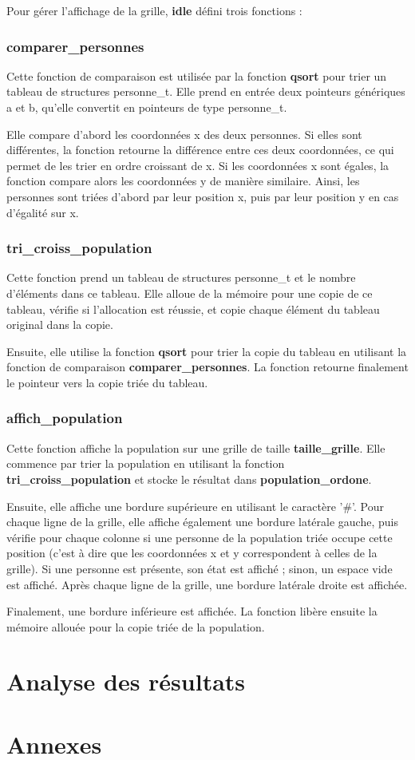 \documentclass[12pt,french,titlepage]{article}
\begin{document}
Pour gérer l'affichage de la grille, \textbf{idle} défini trois fonctions :
\subsubsection*{comparer\_personnes}
Cette fonction de comparaison est utilisée par la fonction \textbf{qsort} pour trier un tableau de structures personne\_t. Elle prend en entrée deux pointeurs génériques a et b, qu'elle convertit en pointeurs de type personne\_t.

Elle compare d'abord les coordonnées x des deux personnes. Si elles sont différentes, la fonction retourne la différence entre ces deux coordonnées, ce qui permet de les trier en ordre croissant de x. Si les coordonnées x sont égales, la fonction compare alors les coordonnées y de manière similaire. Ainsi, les personnes sont triées d'abord par leur position x, puis par leur position y en cas d'égalité sur x.

\subsubsection*{tri\_croiss\_population}
Cette fonction prend un tableau de structures personne\_t et le nombre d'éléments dans ce tableau. Elle alloue de la mémoire pour une copie de ce tableau, vérifie si l'allocation est réussie, et copie chaque élément du tableau original dans la copie.

Ensuite, elle utilise la fonction \textbf{qsort} pour trier la copie du tableau en utilisant la fonction de comparaison \textbf{comparer\_personnes}. La fonction retourne finalement le pointeur vers la copie triée du tableau.

\subsubsection*{affich\_population}
Cette fonction affiche la population sur une grille de taille \textbf{taille\_grille}. Elle commence par trier la population en utilisant la fonction \textbf{tri\_croiss\_population} et stocke le résultat dans \textbf{population\_ordone}.

Ensuite, elle affiche une bordure supérieure en utilisant le caractère '\#'. Pour chaque ligne de la grille, elle affiche également une bordure latérale gauche, puis vérifie pour chaque colonne si une personne de la population triée occupe cette position (c'est à dire que les coordonnées x et y correspondent à celles de la grille). Si une personne est présente, son état est affiché ; sinon, un espace vide est affiché. Après chaque ligne de la grille, une bordure latérale droite est affichée.

Finalement, une bordure inférieure est affichée. La fonction libère ensuite la mémoire allouée pour la copie triée de la population.

\section{Analyse des résultats}

\section{Annexes}
\end{document}
